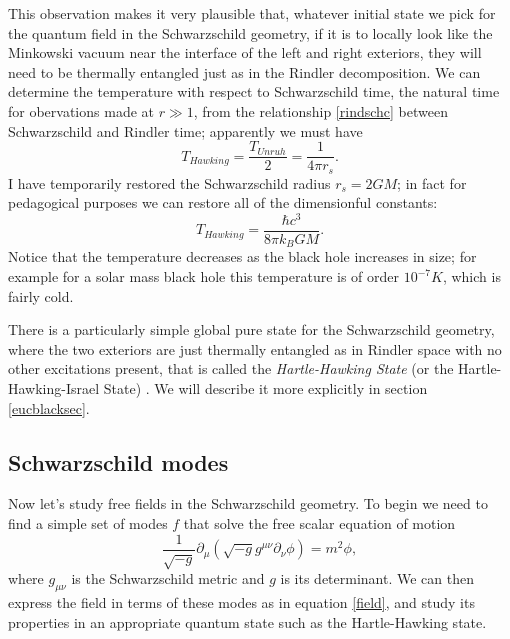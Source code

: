 \documentclass[12pt]{article}
\newcommand{\be}{\begin{equation}}
\newcommand{\ee}{\end{equation}}
\begin{document}
This observation makes it very plausible that, whatever initial state we pick for the quantum field in the Schwarzschild geometry, if it is to locally look like the Minkowski vacuum near the interface of the left and right exteriors, they will need to be thermally entangled just as in the Rindler decomposition.  We can determine the temperature with respect to Schwarzschild time, the natural time for obervations made at $r\gg1$, from the relationship \ref{rindschc} between Schwarzschild and Rindler time; apparently we must have
\be\label{Thawk}
T_{\mathit{Hawking}}=\frac{T_{\mathit{Unruh}}}{2}=\frac{1}{4\pi r_s}.
\ee
I have temporarily restored the Schwarzschild radius $r_s=2GM$; in fact for pedagogical purposes we can restore all of the dimensionful constants:
\be
T_{\mathit{Hawking}}=\frac{\hbar c^3}{8\pi k_B G M}.
\ee
Notice that the temperature decreases as the black hole increases in size; for example for a solar mass black hole this temperature is of order  $10^{-7}K$, which is fairly cold.  

There is a particularly simple global pure state for the Schwarzschild geometry, where the two exteriors are just thermally entangled as in Rindler space with no other excitations present, that is called the \textit{Hartle-Hawking State} (or the Hartle-Hawking-Israel State) \cite{Hartle:1976tp,Israel:1976ur}.  We will describe it more explicitly in section \ref{eucblacksec}. 

\subsection{Schwarzschild modes}\label{modesec}
Now let's study free fields in the Schwarzschild geometry.  To begin we need to find a simple set of modes $f$ that solve the free scalar equation of motion
\be
\frac{1}{\sqrt{-g}}\partial_\mu\left(\sqrt{-g}g^{\mu\nu}\partial_\nu \phi\right)=m^2\phi,
\ee
where $g_{\mu\nu}$ is the Schwarzschild metric and $g$ is its determinant.  We can then express the field in terms of these modes as in equation \eqref{field}, and study its properties in an appropriate quantum state such as the Hartle-Hawking state.   
\end{document}
